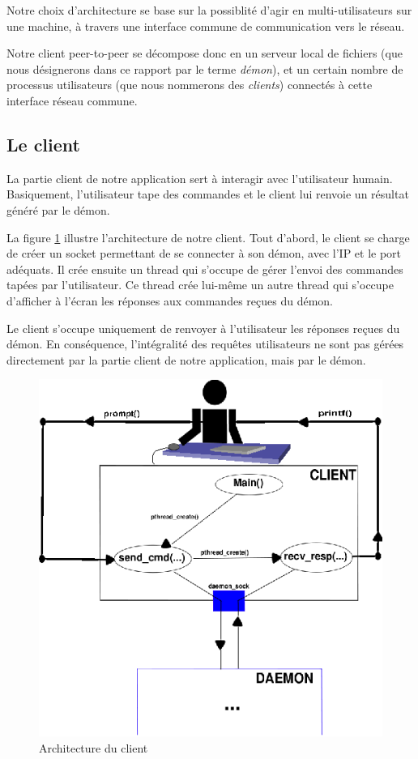 Notre choix d'architecture se base sur la possiblité d'agir en 
multi-utilisateurs sur une machine, à travers une interface commune de 
communication vers le réseau.

Notre client peer-to-peer se décompose donc en un serveur local de fichiers 
(que nous désignerons dans ce rapport par le terme \textit{démon}), et un 
certain nombre de processus utilisateurs (que nous nommerons des 
\textit{clients}) connectés à cette interface réseau commune.
	

\subsection{Le client}
	La partie client de notre application sert à interagir avec 
l'utilisateur humain. Basiquement, l'utilisateur tape des commandes et le 
client lui renvoie un résultat généré par le démon.

La figure \ref{client} illustre l'architecture de notre client. Tout d'abord, 
le client se charge de créer un socket permettant de se connecter à son démon,
 avec l'IP et le port adéquats. Il crée ensuite un thread qui s'occupe de gérer
 l'envoi des commandes tapées par l'utilisateur. Ce thread crée lui-même un 
autre thread qui s'occupe d'afficher à l'écran les réponses aux commandes 
reçues du démon.

Le client s'occupe uniquement de renvoyer à l'utilisateur les réponses reçues
du démon. En conséquence, l'intégralité des requêtes utilisateurs ne sont pas 
gérées directement par la partie client de notre application, mais par le 
démon.
\begin{center}
\begin{figure}[htbp]
    \centering
    \includegraphics[scale=1.4]{archi_client.eps}
    \caption{Architecture du client}
    \label{client}
\end{figure}
\end{center}

